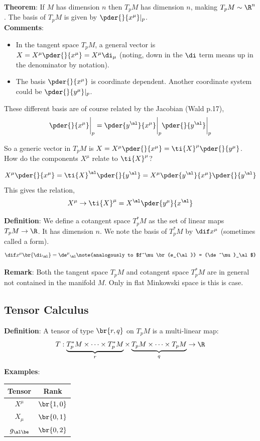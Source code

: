 \documentclass{article}
\begin{document}
\textbf{Theorem}: If $M$ has dimension $n$ then $T_pM$ has dimension $n$, making $T_pM \sim \R^n$. The basis of $T_pM$ is given by $\pder{}{x^\mu} |_p$.\\

\textbf{Comments}:
\begin{itemize}
    \item In the tangent space $T_pM$, a general vector is $X = X^\mu \pder{}{x^\mu} = X^\mu \di_\mu$ (noting, down in the $\di$ term means up in the denominator by notation).
    \item The basis $\pder{}{x^\mu}$ is coordinate dependent. Another coordinate system could be $\pder{}{y^\mu}|_p$.
\end{itemize}

These different basis are of course related by the Jacobian (Wald p.17),
\[ \pder{}{x^\mu}\bigg\rvert_p = \pder{y^\al}{x^\mu}\bigg\rvert_p \pder{}{y^\al}\bigg\rvert_p \]

So a generic vector in $T_pM$ is $X = X^\mu \pder{}{x^\mu} = \ti{X}^\mu \pder{}{y^\mu}$. How do the components $X^\mu$ relate to $\ti{X}^\mu$?

\[ X^\mu \pder{}{x^\mu} = \ti{X}^\al \pder{}{y^\al} = X^\mu \pder{y^\al}{x^\mu} \pder{}{y^\al} \]
This gives the relation,
\[ X^\mu \to \ti{X}^\mu = X^\al \pder{y^\mu}{x^\al}\]

\textbf{Definition}: We define a cotangent space $T^*_pM$ as the set of linear maps $T_pM \to \R$. It has dimension $n$. We note the basis of $T^*_pM$ by $\dif x^\mu$ (sometimes called a form).
\[ \dif x^\mu \br{\di_\al} = {\de^\mu}_\al \note{analogously to $f^\mu\br{e_{\al}} = {\de^\mu}_\al$} \]

\textbf{Remark}: Both the tangent space $T_pM$ and cotangent space $T^*_pM$ are in general not contained in the manifold $M$. Only in flat Minkowski space is this is case.

\subsection{Tensor Calculus}

\textbf{Definition}: A tensor of type $\br{r,q}$ on $T_pM$ is a multi-linear map:
\[ T: \underbrace{T^*_pM \times \cdots \times T^*_pM}_{r} \times \underbrace{T_pM \times \cdots \times T_pM}_{q} \to \R \]

\textbf{Examples}:
\begin{center}
\begin{tabular}{|c|c|}
    \hline
    Tensor & Rank \\
    \hline
    $X^\mu$ & $\br{1,0}$ \\
    $X_\mu$ & $\br{0,1}$ \\
    $g_{\al\be}$ & $\br{0,2}$ \\
    \hline
\end{tabular}
\end{center}
\end{document}
